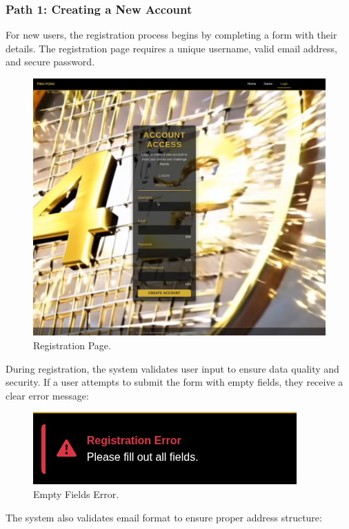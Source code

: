 \subsubsection{Path 1: Creating a New Account} For new users, the registration process begins by completing a form with their details. The registration page requires a unique username, valid email address, and secure password.

\begin{figure}[H]
    \centering
    \includegraphics[width=0.7\linewidth]{Figures/images/new_images/RegistrationPage.png}
    \caption{Registration Page.} %
    \label{fig:registration-page}
\end{figure}

During registration, the system validates user input to ensure data quality and security. If a user attempts to submit the form with empty fields, they receive a clear error message:

\begin{figure}[H]
    \centering
    \includegraphics[width=0.6\linewidth]{Figures/images/new_images/ErrorFillOutAllTheFields.png}
    \caption{Empty Fields Error.} %
    \label{fig:error-empty-fields-wireframe}
\end{figure}

The system also validates email format to ensure proper address structure:

